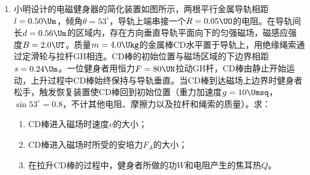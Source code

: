 \documentclass[\gkver]{gaokaozhenti}
\begin{document}
\begin{enumerate}
{\begin{enumerate}
\end{enumerate}
}

\item
小明设计的电磁健身器的简化装置如图所示，两根平行金属导轨相距$l=0.50\Um$，倾角$\theta=53^\circ$，导轨上端串接一个$R=0.05\UO$的电阻。在导轨间长$d=0.56\Um$的区域内，存在方向垂直导轨平面向下的匀强磁场，磁感应强度$B=2.0\UT$。质量$m=4.0\Ukg$的金属棒CD水平置于导轨上，用绝缘绳索通过定滑轮与拉杆GH相连。CD棒的初始位置与磁场区域的下边界相距$s=0.24\Um$。一位健身者用恒力$F=80\UN$拉动GH杆，CD棒由静止开始运动，上升过程中CD棒始终保持与导轨垂直。当CD棒到达磁场上边界时健身者松手，触发恢复装置使CD棒回到初始位置（重力加速度$g=10\Umsq$，$\sin 53^\circ=0.8$，不计其他电阻、摩擦力以及拉杆和绳索的质量）。求：
\begin{enumerate}
	\item
	CD棒进入磁场时速度$v$的大小；

	\item
	CD棒进入磁场时所受的安培力$F_{A}$的大小；

	\item
	在拉升CD棒的过程中，健身者所做的功$W$和电阻产生的焦耳热$Q$。

\end{enumerate}
\onepicture[align=right, w=5.76cm]{}
\jdanswer{
\begin{enumerate}
	\item
	$2.4\Ums$


\end{enumerate}}
\end{enumerate}
\end{document}
